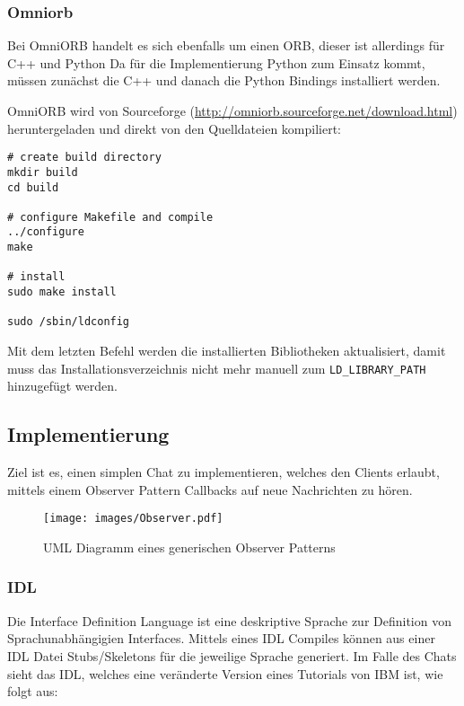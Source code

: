 \subsubsection{Omniorb}
Bei OmniORB handelt es sich ebenfalls um einen ORB, dieser ist allerdings f\"ur C++ und Python
Da f\"ur die Implementierung Python zum Einsatz kommt, m\"ussen zun\"achst die C++ und danach die Python Bindings installiert werden.

OmniORB wird von Sourceforge (\url{http://omniorb.sourceforge.net/download.html}) heruntergeladen und direkt von den Quelldateien kompiliert:
\begin{lstlisting}[caption=Installation von OmniORB]
# create build directory
mkdir build
cd build

# configure Makefile and compile
../configure
make

# install
sudo make install

sudo /sbin/ldconfig
\end{lstlisting}

Mit dem letzten Befehl werden die installierten Bibliotheken aktualisiert, damit muss das Installationsverzeichnis nicht mehr manuell zum \texttt{LD\_LIBRARY\_PATH} hinzugef\"ugt werden.

\subsection{Implementierung}
Ziel ist es, einen simplen Chat zu implementieren, welches den Clients erlaubt, mittels einem Observer Pattern Callbacks auf neue Nachrichten zu h\"oren.

\begin{figure}[H]
	\begin{center}
		\texttt{[image: images/Observer.pdf]}
		\caption{UML Diagramm eines generischen Observer Patterns\cite{rmi-tutorial}}
		\label{broker}
	\end{center}
\end{figure}

\subsubsection{IDL}
Die Interface Definition Language ist eine deskriptive Sprache zur Definition von Sprachunabh\"angigien Interfaces.
Mittels eines IDL Compiles k\"onnen aus einer IDL Datei Stubs/Skeletons f\"ur die jeweilige Sprache generiert.
Im Falle des Chats sieht das IDL, welches eine ver\"anderte Version eines Tutorials von IBM ist, wie folgt aus:

